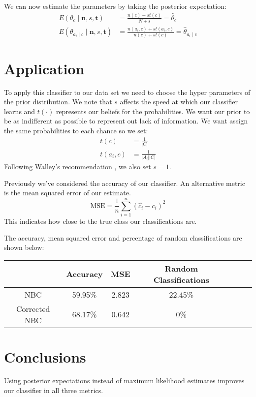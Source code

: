 We can now estimate the parameters by taking the posterior expectation:
\begin{align}
	E(\theta_c \mid \mathbf{n},s,\mathbf{t}) & = \frac{n(c) + st(c)}{N + s} = \hat{\theta}_c \\
	E(\theta_{a_i \mid c} \mid \mathbf{n},s,\mathbf{t}) & = \frac{n(a_i, c) + st(a_i, c)}{n(c) + st(c)} = \hat{\theta}_{a_i \mid c}
\end{align}

\section{Application}

To apply this classifier to our data set we need to choose the hyper parameters of the prior distribution.
We note that $s$ affects the speed at which our classifier learns and $t(\cdot)$ represents our beliefs for the probabilities.
We want our prior to be as indifferent as possible \cite{laplace1812} to represent out lack of information.
We want assign the same probabilities to each chance so we set:
\begin{align}\label{initial prior}
	t(c) & = \frac{1}{|C|} \\
	t(a_i, c) & = \frac{1}{|A_i||C|}
\end{align}
Following Walley's recommendation \cite{Walley96}, we also set $s=1$.

Previously we've considered the accuracy of our classifier.
An alternative metric is the mean squared error of our estimate.
\begin{equation}
	\text{MSE} = \frac{1}{n}\sum_{i=1}^n(\hat{c_i} - c_i)^2
\end{equation}
This indicates how close to the true class our classifications are.

The accuracy, mean squared error and percentage of random classifications are shown below:
\begin{center}
	\begin{tabular}{ c|c c c c c c }
		              & Accuracy & MSE   & Random Classifications\\
		\hline
		NBC           & 59.95\%  & 2.823 & 22.45\% \\
		Corrected NBC & 68.17\%  & 0.642 & 0\%
	\end{tabular}
\end{center}

\section{Conclusions}
Using posterior expectations instead of maximum likelihood estimates improves our classifier in all three metrics.

